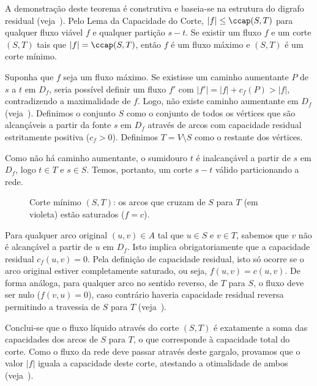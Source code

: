 \begin{demonstracao}
A demonstração deste teorema é construtiva e baseia-se na estrutura do digrafo residual (veja~\cite{ford1956maximal, cook1998combinatorial}). Pelo Lema da Capacidade do Corte, $|f| \le \ccap(S, T)$ para qualquer fluxo viável $f$ e qualquer partição $s-t$. Se existir um fluxo $f$ e um corte $(S, T)$ tais que $|f| = \ccap(S, T)$, então $f$ é um fluxo máximo e $(S, T)$ é um corte mínimo.

Suponha que $f$ seja um fluxo máximo. Se existisse um caminho aumentante $P$ de $s$ a $t$ em $D_f$, seria possível definir um fluxo $f'$ com $|f'| = |f| + c_f(P) > |f|$, contradizendo a maximalidade de $f$. Logo, não existe caminho aumentante em $D_f$ (veja~\cite{ahuja1993network}). Definimos o conjunto $S$ como o conjunto de todos os vértices que são alcançáveis a partir da fonte $s$ em $D_f$ através de arcos com capacidade residual estritamente positiva ($c_f > 0$). Definimos $T = V \setminus S$ como o restante dos vértices.

Como não há caminho aumentante, o sumidouro $t$ é inalcançável a partir de $s$ em $D_f$, logo $t \in T$ e $s \in S$. Temos, portanto, um corte $s-t$ válido particionando a rede.

\begin{figure}[!ht]
\centering

\caption{Corte mínimo $(S,T)$: os arcos que cruzam de $S$ para $T$ (em violeta) estão saturados ($f = c$).}
\label{fig:corte_minimo}
\end{figure}

Para qualquer arco original $(u,v) \in A$ tal que $u \in S$ e $v \in T$, sabemos que $v$ não é alcançável a partir de $u$ em $D_f$. Isto implica obrigatoriamente que a capacidade residual $c_f(u,v) = 0$. Pela definição de capacidade residual, isto só ocorre se o arco original estiver completamente saturado, ou seja, $f(u,v) = c(u,v)$. De forma análoga, para qualquer arco no sentido reverso, de $T$ para $S$, o fluxo deve ser nulo ($f(v,u) = 0$), caso contrário haveria capacidade residual reversa permitindo a travessia de $S$ para $T$ (veja~\cite{cook1998combinatorial}).

Conclui-se que o fluxo líquido através do corte $(S, T)$ é exatamente a soma das capacidades dos arcos de $S$ para $T$, o que corresponde à capacidade total do corte. Como o fluxo da rede deve passar através deste gargalo, provamos que o valor $|f|$ iguala a capacidade deste corte, atestando a otimalidade de ambos (veja~\cite{ford1956maximal}). \end{demonstracao}

